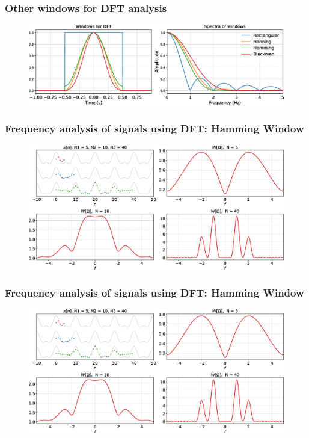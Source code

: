 \documentclass[aspectratio=169]{beamer}
\begin{document}
\begin{frame}[t]
  \frametitle{Other windows for DFT analysis}
  \begin{figure}
  \centering
  \includegraphics[width=1\textwidth]{img/dft-windows.eps}
  \end{figure}
\end{frame}


\begin{frame}[t]
  \frametitle{Frequency analysis of signals using DFT: Hamming Window}
  \begin{figure}
  \centering
  \includegraphics[width=1\textwidth]{img/dft-resolve2-hamming.eps}
  \end{figure}
\end{frame}


\begin{frame}[t]
  \frametitle{Frequency analysis of signals using DFT: Hamming Window}
  \begin{figure}
  \centering
  \includegraphics[width=1\textwidth]{img/dft-resolve2-hamming.eps}
  \end{figure}
\end{frame}
\end{document}
